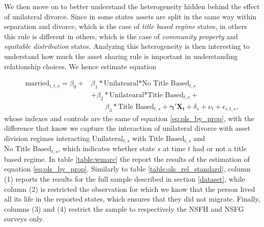 \documentclass[12pt]{article}
\numberwithin{table}{section}
\begin{document}
We then move on to better understand the heterogeneity hidden behind the effect of unilateral divorce. Since in some states assets are split in the same way within separation and divorce, which is the case of \textit{title based regime} states, in others this rule is different in others, which is the case of \textit{community property} and \textit{equitable distribution} states. Analyzing this heterogeneity is then interesting to understand how much the asset sharing rule is important in understanding relationship choices.  We hence estimate equation


\begin{equation}\label{eq:ols_by_prop}
\begin{split}
\text{married}_{i,t,s}=\beta_0+&\beta_1*\text{Unilatearal*No Title Based}_{t,s}\\&+\beta_2*\text{Unilatearal*Title Based}_{t,s}+\\&\quad\quad\beta_3*\text{Title Based}_{t,s}+\mathbf{\gamma'}\mathbf{X_i}+\delta_s+\nu_t+\epsilon_{i,t,s},
\end{split}
\end{equation}
whose  indexes and controls are the same of equation \ref{eq:ols_by_prop}, with the difference that know we capture the interaction of unilateral divorce with asset division regimes interacting $\text{Unilateral}_{t,s}$ with  $\text{Title Based}_{t,s}$ and $\text{No Title Based}_{t,s}$, which indicates whether state $s$ at time $t$ had or not a title based regime. In table \ref{table:wmarc} the report the results of the estimation of equation \ref{eq:ols_by_prop}. Similarly to table \ref{table:ols_rel_standard}, column (1) reports the results for the full sample described in section \ref{dataset}, while column (2) is restricted the observation for which we know that the person lived all its life in the reported states, which ensures that they did not migrate. Finally, columns (3) and (4) restrict the sample to respectively the NSFH and NSFG surveys only.
\end{document}
